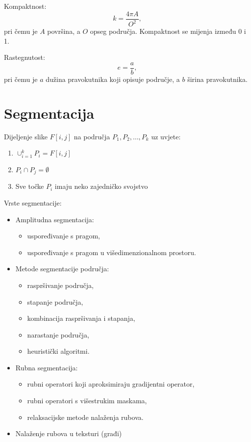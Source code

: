 \documentclass[11pt,english]{article}
\begin{document}
Kompaktnost:
$$k = \dfrac{4\pi A}{O^2},$$
pri čemu je $A$ površina, a $O$ opseg područja. Kompaktnost se mijenja između 0 i 1.

Rastegnutost:
$$e = \dfrac{a}{b},$$
pri čemu je $a$ dužina pravokutnika koji opisuje područje, a $b$ širina pravokutnika.

\section{Segmentacija}
Dijeljenje slike $F[i,j]$ na područja $P_1,P_2, \ldots, P_k$ uz uvjete:
\begin{enumerate}
  \item $\cup^k_{i=1}P_i = F[i,j]$
  \item $P_i \cap P_j = \emptyset$
  \item Sve točke $P_i$ imaju neko zajedničko svojstvo
\end{enumerate}
Vrste segmentacije:
\begin{itemize}
  \item Amplitudna segmentacija:
  \begin{itemize}
    \item uspoređivanje s pragom,
    \item uspoređivanje s pragom u višedimenzionalnom prostoru.
  \end{itemize}
  \item Metode segmentacije područja:
  \begin{itemize}
    \item raspršivanje područja,
    \item stapanje područja,
    \item kombinacija raspršivanja i stapanja,
    \item narastanje područja,
    \item heuristički algoritmi.
  \end{itemize}
  \item Rubna segmentacija:
  \begin{itemize}
    \item rubni operatori koji aproksimiraju gradijentni operator,
    \item rubni operatori s višestrukim maskama,
    \item relaksacijske metode nalaženja rubova.
  \end{itemize}
  \item Nalaženje rubova u teksturi (građi)
\end{itemize}
\end{document}
